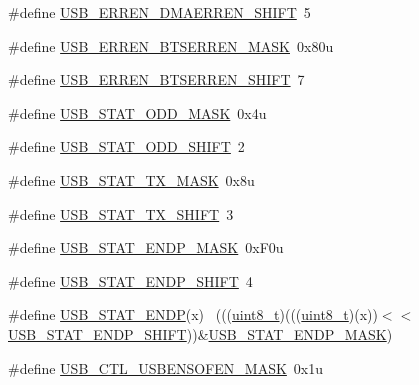 \begin{DoxyCompactItemize}
\#define \hyperlink{group___u_s_b___register___masks_ga8b75afb2fa004a75b39023e38db4e784}{U\+S\+B\+\_\+\+E\+R\+R\+E\+N\+\_\+\+D\+M\+A\+E\+R\+R\+E\+N\+\_\+\+S\+H\+I\+FT}~5
\item 
\#define \hyperlink{group___u_s_b___register___masks_ga806a809f05df66a7669733c599646f7f}{U\+S\+B\+\_\+\+E\+R\+R\+E\+N\+\_\+\+B\+T\+S\+E\+R\+R\+E\+N\+\_\+\+M\+A\+SK}~0x80u
\item 
\#define \hyperlink{group___u_s_b___register___masks_ga5e760a100c4f43ecfd71952a5f393d77}{U\+S\+B\+\_\+\+E\+R\+R\+E\+N\+\_\+\+B\+T\+S\+E\+R\+R\+E\+N\+\_\+\+S\+H\+I\+FT}~7
\item 
\#define \hyperlink{group___u_s_b___register___masks_ga49caa3c5b36fc89eadadd60cdf331643}{U\+S\+B\+\_\+\+S\+T\+A\+T\+\_\+\+O\+D\+D\+\_\+\+M\+A\+SK}~0x4u
\item 
\#define \hyperlink{group___u_s_b___register___masks_ga15f3e2fa671ea1a59e0b24a9697faf8a}{U\+S\+B\+\_\+\+S\+T\+A\+T\+\_\+\+O\+D\+D\+\_\+\+S\+H\+I\+FT}~2
\item 
\#define \hyperlink{group___u_s_b___register___masks_gab953f904ef3a2b838a922ebdf69cf140}{U\+S\+B\+\_\+\+S\+T\+A\+T\+\_\+\+T\+X\+\_\+\+M\+A\+SK}~0x8u
\item 
\#define \hyperlink{group___u_s_b___register___masks_ga5173e8423017932d90919ddb18f918bd}{U\+S\+B\+\_\+\+S\+T\+A\+T\+\_\+\+T\+X\+\_\+\+S\+H\+I\+FT}~3
\item 
\#define \hyperlink{group___u_s_b___register___masks_gad8a184e838de511e23aa32011fc9f0b6}{U\+S\+B\+\_\+\+S\+T\+A\+T\+\_\+\+E\+N\+D\+P\+\_\+\+M\+A\+SK}~0x\+F0u
\item 
\#define \hyperlink{group___u_s_b___register___masks_ga5d85a4b028002bc9ce0f1650111cd49a}{U\+S\+B\+\_\+\+S\+T\+A\+T\+\_\+\+E\+N\+D\+P\+\_\+\+S\+H\+I\+FT}~4
\item 
\#define \hyperlink{group___u_s_b___register___masks_gad3e8103c4490cdec9585e10998f3e4b2}{U\+S\+B\+\_\+\+S\+T\+A\+T\+\_\+\+E\+N\+DP}(x)                                              ~(((\hyperlink{_p_e___types_8h_aba7bc1797add20fe3efdf37ced1182c5}{uint8\+\_\+t})(((\hyperlink{_p_e___types_8h_aba7bc1797add20fe3efdf37ced1182c5}{uint8\+\_\+t})(x))$<$$<$\hyperlink{group___u_s_b___register___masks_ga5d85a4b028002bc9ce0f1650111cd49a}{U\+S\+B\+\_\+\+S\+T\+A\+T\+\_\+\+E\+N\+D\+P\+\_\+\+S\+H\+I\+FT}))\&\hyperlink{group___u_s_b___register___masks_gad8a184e838de511e23aa32011fc9f0b6}{U\+S\+B\+\_\+\+S\+T\+A\+T\+\_\+\+E\+N\+D\+P\+\_\+\+M\+A\+SK})
\item 
\#define \hyperlink{group___u_s_b___register___masks_gaa406be72ac0b31143d3a3bc357af334b}{U\+S\+B\+\_\+\+C\+T\+L\+\_\+\+U\+S\+B\+E\+N\+S\+O\+F\+E\+N\+\_\+\+M\+A\+SK}~0x1u
$$
\end{DoxyCompactItemize}
